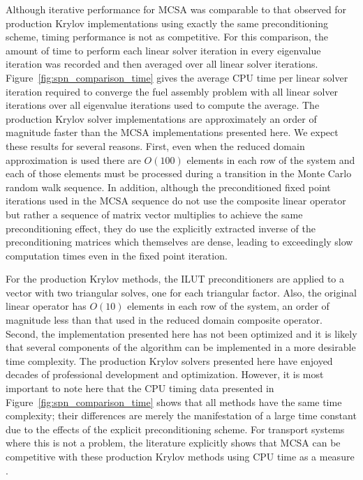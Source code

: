 Although iterative performance for MCSA was comparable to that
observed for production Krylov implementations using exactly the same
preconditioning scheme, timing performance is not as competitive. For
this comparison, the amount of time to perform each linear solver
iteration in every eigenvalue iteration was recorded and then averaged
over all linear solver
iterations. Figure~\ref{fig:spn_comparison_time} gives the average CPU
time per linear solver iteration required to converge the fuel
assembly problem with all linear solver iterations over all eigenvalue
iterations used to compute the average. The production Krylov solver
implementations are approximately an order of magnitude faster than
the MCSA implementations presented here. We expect these results for
several reasons. First, even when the reduced domain approximation is
used there are $O(100)$ elements in each row of the system and each of
those elements must be processed during a transition in the Monte
Carlo random walk sequence. In addition, although the preconditioned
fixed point iterations used in the MCSA sequence do not use the
composite linear operator but rather a sequence of matrix vector
multiplies to achieve the same preconditioning effect, they do use the
explicitly extracted inverse of the preconditioning matrices which
themselves are dense, leading to exceedingly slow computation times
even in the fixed point iteration. 

For the production Krylov methods, the ILUT preconditioners are
applied to a vector with two triangular solves, one for each
triangular factor. Also, the original linear operator has $O(10)$
elements in each row of the system, an order of magnitude less than
that used in the reduced domain composite operator. Second, the
implementation presented here has not been optimized and it is likely
that several components of the algorithm can be implemented in a more
desirable time complexity. The production Krylov solvers presented
here have enjoyed decades of professional development and
optimization. However, it is most important to note here that the CPU
timing data presented in Figure~\ref{fig:spn_comparison_time} shows
that all methods have the same time complexity; their differences are
merely the manifestation of a large time constant due to the effects
of the explicit preconditioning scheme. For transport systems where
this is not a problem, the literature explicitly shows that MCSA can
be competitive with these production Krylov methods using CPU time as
a measure \cite{evans_monte_2012}.

